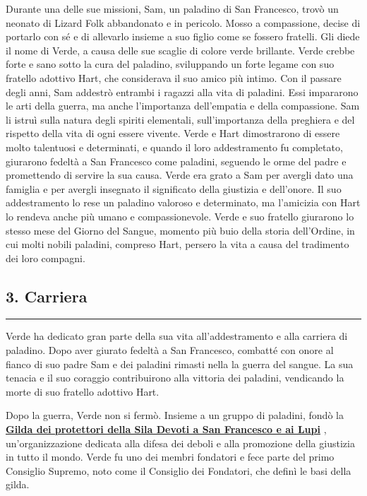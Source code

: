 Durante una delle sue missioni, Sam, un paladino di San Francesco, trovò
un neonato di Lizard Folk abbandonato e in pericolo. Mosso a
compassione, decise di portarlo con sé e di allevarlo insieme a suo
figlio come se fossero fratelli. Gli diede il nome di Verde, a causa
delle sue scaglie di colore verde brillante. Verde crebbe forte e sano
sotto la cura del paladino, sviluppando un forte legame con suo fratello
adottivo Hart, che considerava il suo amico più intimo. Con il passare
degli anni, Sam addestrò entrambi i ragazzi alla vita di paladini. Essi
impararono le arti della guerra, ma anche l'importanza dell'empatia e
della compassione. Sam li istruì sulla natura degli spiriti elementali,
sull'importanza della preghiera e del rispetto della vita di ogni essere
vivente. Verde e Hart dimostrarono di essere molto talentuosi e
determinati, e quando il loro addestramento fu completato, giurarono
fedeltà a San Francesco come paladini, seguendo le orme del padre e
promettendo di servire la sua causa. Verde era grato a Sam per avergli
dato una famiglia e per avergli insegnato il significato della giustizia
e dell'onore. Il suo addestramento lo rese un paladino valoroso e
determinato, ma l'amicizia con Hart lo rendeva anche più umano e
compassionevole. Verde e suo fratello giurarono lo stesso mese del
Giorno del Sangue, momento più buio della storia dell'Ordine, in cui
molti nobili paladini, compreso Hart, persero la vita a causa del
tradimento dei loro compagni.

\subsection{3. Carriera}\label{carriera}

\begin{center}\rule{0.5\linewidth}{0.5pt}\end{center}

Verde ha dedicato gran parte della sua vita all'addestramento e alla
carriera di paladino. Dopo aver giurato fedeltà a San Francesco,
combatté con onore al fianco di suo padre Sam e dei paladini rimasti
nella la guerra del sangue. La sua tenacia e il suo coraggio
contribuirono alla vittoria dei paladini, vendicando la morte di suo
fratello adottivo Hart.

Dopo la guerra, Verde non si fermò. Insieme a un gruppo di paladini,
fondò la
\href{Gilda\%20dei\%20protettori\%20della\%20Sila\%20Devoti\%20a\%20San\%20Franc\%20e29bb7909af24fee931336355db913d4.md}{\textbf{Gilda
dei protettori della Sila Devoti a San Francesco e ai Lupi}} ,
un'organizzazione dedicata alla difesa dei deboli e alla promozione
della giustizia in tutto il mondo. Verde fu uno dei membri fondatori e
fece parte del primo Consiglio Supremo, noto come il Consiglio dei
Fondatori, che definì le basi della gilda.

